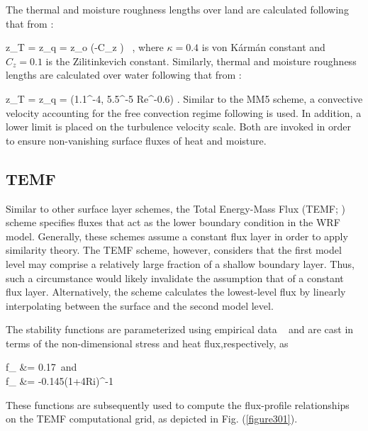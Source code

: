 The thermal and moisture roughness lengths over land are calculated following that from  \citet{Zilit}:

\be
z_T = z_q = z_o \exp \left(-\kappa C_z \right) \mbox{ ,} \label{equation331}
\ee
\noindent
 where $\kappa = 0.4$ is von K\'{a}rm\'{a}n constant and $C_z = 0.1$ is the Zilitinkevich constant. Similarly, thermal and moisture roughness lengths are calculated over water following that from  \citet{Fairall2003}:

\be
z_T = z_q = \min \left(1.1^{-4}, 5.5^{-5} Re^{-0.6}\right) \mbox{.} \label{332}
\ee
\noindent
 Similar to the MM5 scheme, a convective velocity accounting for the free convection regime following  \citet{Beljaars} is used. In addition, a lower limit is placed on the turbulence velocity scale. Both are invoked in order to ensure non-vanishing surface fluxes of heat and moisture. 

\subsection{TEMF}
\label{sl-temf-354}

Similar to other surface layer schemes, the Total Energy-Mass Flux (TEMF; \citealt{Angevine2010}) scheme specifies fluxes that act as the lower boundary condition in the WRF model. Generally, these schemes assume a constant flux layer in order to apply similarity theory. The TEMF scheme, however, considers that the first model level may comprise a relatively large fraction of a shallow boundary layer. Thus, such a circumstance would likely invalidate the assumption that of a constant flux layer. Alternatively, the scheme calculates the lowest-level flux by linearly interpolating between the surface and the second model level. 

The stability functions are parameterized using empirical data ~\citep{MS2007} and are cast in terms of the non-dimensional stress and heat flux,respectively, as

\bse \label{equation333}
\bal
f_{\tau} &= 0.17 \mbox{ and} \label{equation333a} \\
f_{\theta} &= -0.145\left(1+4Ri\right)^{-1} \label{equation333b}
\eal
\ese


These functions are subsequently used to compute the flux-profile relationships on the TEMF computational grid, as depicted in Fig. (\autoref{figure301}).


